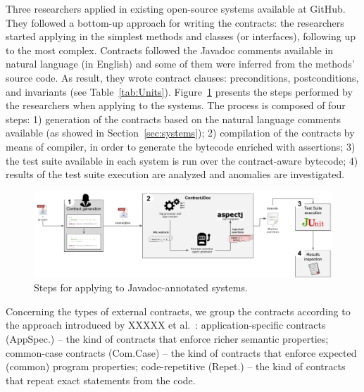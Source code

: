 Three researchers applied \contractjdoc{} in \totalSystems{} existing open-source systems
available at GitHub. They followed a bottom-up approach for
writing the \contractjdoc{} contracts: the researchers started applying
\contractjdoc{} in the simplest methods and classes (or interfaces), following
up to the most complex. Contracts followed the Javadoc comments available in
natural language (in English) and some of them were inferred from the methods'
source code.
As result, they wrote \totalClauses{} contract clauses:
\totalPre{} preconditions, \totalPost{} postconditions, and \totalInv{} invariants (see
Table~\ref{tab:Units}).
Figure~\ref{fig:applicationProcess} presents the steps performed by the researchers when applying
\contractjdoc{} to the systems. The process is composed of four steps: 1) generation of the
contracts based on the natural language comments available (as showed in
Section~\ref{sec:systems}); 2) compilation of the contracts by means of
\contractjdocCompiler{} compiler, in order to generate the bytecode enriched
with assertions; 3) the test suite available in each system is run over the
contract-aware bytecode; 4) results of the test suite execution are analyzed and
anomalies are investigated.

\begin{figure}[h]
\centering
\includegraphics[width=1.0\textwidth]{figs/ContractJDocProcess}
\caption{Steps for applying \contractjdoc{} to Javadoc-annotated systems.}
\label{fig:applicationProcess}
\end{figure}

Concerning the types of external contracts, we group the contracts according to
the approach introduced by XXXXX et al.~\cite{typeContracts}: application-specific contracts
(AppSpec.) -- the kind of contracts that enforce richer semantic properties;
 common-case contracts (Com.Case) -- the kind of contracts that enforce
expected (common) program properties;
code-repetitive (Repet.) -- the kind of
contracts that repeat exact statements from the code.

